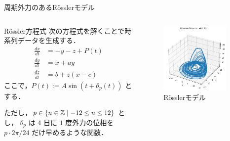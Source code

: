 \begin{frame}{周期外力のあるRösslerモデル}
    \vspace{-.35cm}
    \begin{columns}[T] %
  
      \begin{column}{.5\textwidth}
        \begin{block}{Rössler方程式}
            次の方程式を解くことで時系列データを生成する．
            \begin{align}
                \frac{dx}{dt} &= -y - z + P(t)\\
                \frac{dy}{dt} &= x + ay \\
                \frac{dz}{dt} &= b + z(x - c)
            \end{align}
            ここで，$P(t) := A \sin(t + \theta_p(t))$ とする．
           
            ただし，$p \in \left\{ n \in \mathbb{Z} \mid -12 \leq n \leq 12 \right\}$ とし，
            $\theta_p$ は $4$ 日に $1$ 度外力の位相を $p\cdot 2\pi/24$ だけ早めるような関数．
        \end{block}
      \end{column}
      \begin{column}{.5\textwidth}
        \vspace{-.6cm}
        \begin{figure}
            \includegraphics[width=0.9\textwidth]{Fig/NEWrossler_attractor.png}
            \caption{\scriptsize{Rösslerモデル}}
        \end{figure}
        
      \end{column}
    \end{columns}
  \end{frame}


